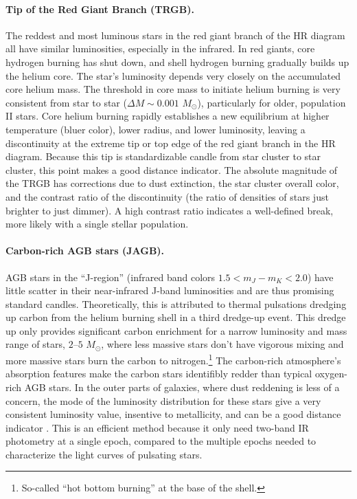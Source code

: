 \paragraph{Tip of the Red Giant Branch (TRGB).}  The reddest and most luminous stars in the red giant branch of the HR diagram all have similar luminosities, especially in the infrared.  In red giants, core hydrogen burning has shut down, and shell hydrogen burning gradually builds up the helium core.  The star's luminosity depends very closely on the accumulated core helium mass.  The threshold in core mass to initiate helium burning is very consistent from star to star ($\Delta M \sim 0.001$ $M_\odot$), particularly for older, population II stars.  Core helium burning rapidly establishes a new  equilibrium at higher temperature (bluer color), lower radius, and lower luminosity, leaving a discontinuity at the extreme tip or top edge of the red giant branch in the HR diagram.  Because this tip is standardizable candle from star cluster to star cluster, this point makes a good distance indicator.  The absolute magnitude of the TRGB has corrections due to dust extinction, the star cluster overall color, and the contrast ratio of the discontinuity (the ratio of densities of stars just brighter to just dimmer).   A high contrast ratio indicates a well-defined break, more likely with a single stellar population. 

\paragraph{Carbon-rich AGB stars (JAGB).}  AGB stars in the ``J-region'' (infrared band colors $1.5 < m_J - m_K < 2.0$) have little scatter in their near-infrared J-band luminosities and are thus promising standard candles.    Theoretically, this is attributed to thermal pulsations dredging up carbon from the helium burning shell in a third dredge-up event. This dredge up only provides significant carbon enrichment for a narrow luminosity and mass range of stars, $2$--$5$ $M_\odot$, where less massive stars don't have vigorous mixing and more massive stars burn the carbon to nitrogen.\footnote{So-called ``hot bottom burning'' at the base of the shell.}  The carbon-rich atmosphere's absorption features make the carbon stars identifibly redder than typical oxygen-rich AGB stars.  In the outer parts of galaxies, where dust reddening is less of a concern, the mode of the luminosity distribution for these stars give a very consistent luminosity value, insentive to metallicity, and can be a good distance indicator \citep{2023ApJ...956...15L}.  This is an efficient method because it only need two-band IR photometry at a single epoch, compared to the multiple epochs needed to characterize the light curves of pulsating stars.


